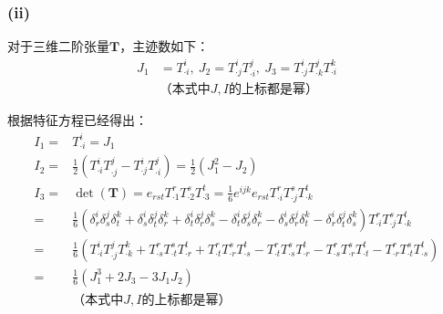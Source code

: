 \documentclass[UTF8,zihao=5]{ctexart}
\newcommand{\bm}[1]{{\mathbf{#1}}}
\begin{document}
\subsubsection*{(ii)}
对于三维二阶张量$\bm{T}$，主迹数如下：
\begin{equation}
    \begin{aligned}
        J_1 & =T^i_{\cdot i},\
        J_2=T^i_{\cdot j}T^j_{\cdot i},\
        J_3=T^i_{\cdot j}T^j_{\cdot k}T^k_{\cdot i} \\
            & \text{（本式中$J,I$的上标都是幂）}
    \end{aligned}
\end{equation}

根据特征方程已经得出：
\begin{equation}
    \begin{aligned}
        I_1= & T^i_{\cdot i}=J_1                                            \\
        I_2= & \frac{1}{2}\left(T^i_{\cdot i}T^j_{\cdot j}
        -T^i_{\cdot j}T^j_{\cdot i}\right)
        =\frac{1}{2}(J_1^2-J_2)                                             \\
        I_3= & \det(\bm{T})=e_{rst}T^r_{\cdot 1}T^s_{\cdot 2}T^t_{\cdot 3}=
        \frac{1}{6}e^{ijk}e_{rst}T^r_{\cdot i}T^s_{\cdot j}T^t_{\cdot k}    \\
        =    &
        \frac{1}{6}
        \left(\delta^i_r\delta^j_s\delta^k_t +
        \delta^i_s\delta^j_t\delta^k_r +
        \delta^i_t\delta^j_r\delta^k_s -
        \delta^i_t\delta^j_s\delta^k_r -
        \delta^i_s\delta^j_r\delta^k_t -
        \delta^i_r\delta^j_t\delta^k_s\right)
        T^r_{\cdot i}T^s_{\cdot j}T^t_{\cdot k}                             \\
        =    &
        \frac{1}{6}
        \left(
        T^i_{\cdot i}T^j_{\cdot j}T^k_{\cdot k}+
        T^r_{\cdot s}T^s_{\cdot t}T^t_{\cdot r}+
        T^r_{\cdot t}T^s_{\cdot r}T^t_{\cdot s}-
        T^r_{\cdot t}T^s_{\cdot s}T^t_{\cdot r}-
        T^r_{\cdot s}T^s_{\cdot r}T^t_{\cdot t}-
        T^r_{\cdot r}T^s_{\cdot t}T^t_{\cdot s}
        \right)                                                             \\
        =    &
        \frac{1}{6}
        \left(
        J_1^3+2J_3-3J_1J_2
        \right)                                                             \\
             & \text{（本式中$J,I$的上标都是幂）}
    \end{aligned}
\end{equation}
\end{document}
